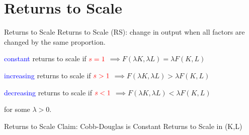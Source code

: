 \documentclass[notes,11pt, aspectratio=169, xcolor=table]{beamer}
\newcommand{\blue}[1]{\textcolor{blue}{#1}}
\newenvironment{wideitemize}{\itemize\addtolength{\itemsep}{10pt}}{\enditemize}
\begin{document}
\section{Returns to Scale}

\begin{frame}{Returns to Scale}
  \huge{Returns to Scale (RS): change in output when all factors are changed by the same proportion.} \\
    \normalsize{\begin{wideitemize}
        \item<3-> \blue{constant} returns to scale if $\textcolor{red}{s = 1}$ $\implies F(\lambda K,\lambda L) = \lambda F(K,L)$
        \item<4-> \blue{increasing} returns to scale if $\textcolor{red}{s > 1}$ $\implies F(\lambda K,\lambda L) > \lambda F(K,L)$
        \item<5-> \blue{decreasing} returns to scale if $\textcolor{red}{s < 1}$ $\implies F(\lambda K,\lambda L) < \lambda F(K,L)$
        \end{wideitemize} }

        for some $\lambda > 0$.
\end{frame}


\begin{frame}{Returns to Scale}
  \Large Claim: Cobb-Douglas is Constant Returns to Scale in (K,L)  \vspace{20pt}
\end{frame}
\end{document}
